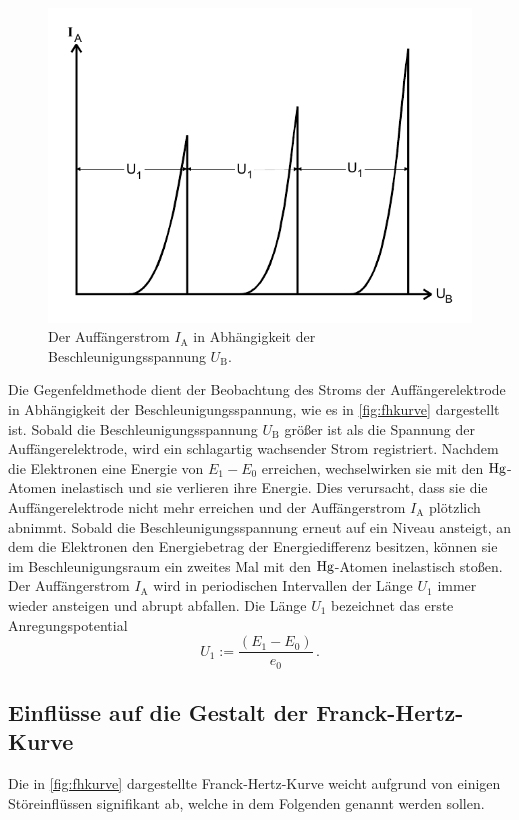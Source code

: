 \begin{figure}[H]
    \centering
    \includegraphics[width=0.6\linewidth]{pictures/frank-hertz-kurve.pdf}
    \caption{Der Auffängerstrom $I_\text{A}$ in Abhängigkeit der Beschleunigungsspannung $U_\text{B}$. \cite{v601}}
    \label{fig:fhkurve}
\end{figure}

Die Gegenfeldmethode dient der Beobachtung des Stroms der Auffängerelektrode in Abhängigkeit der Beschleunigungsspannung,
wie es in \autoref{fig:fhkurve} dargestellt ist.
Sobald die Beschleunigungsspannung $U_\text{B}$ größer ist als die Spannung der Auffängerelektrode, wird ein schlagartig wachsender Strom registriert.
Nachdem die Elektronen eine Energie von $E_1 - E_0$ erreichen, wechselwirken sie mit den $\ce{Hg}$-Atomen inelastisch und sie verlieren ihre Energie.
Dies verursacht, dass sie die Auffängerelektrode nicht mehr erreichen und der Auffängerstrom $I_\text{A}$ plötzlich abnimmt.
Sobald die Beschleunigungsspannung erneut auf ein Niveau ansteigt, an dem die Elektronen den Energiebetrag der Energiedifferenz besitzen,
können sie im Beschleunigungsraum ein zweites Mal mit den $\ce{Hg}$-Atomen inelastisch stoßen.
Der Auffängerstrom $I_\text{A}$ wird in periodischen Intervallen der Länge $U_1$ immer wieder ansteigen und abrupt abfallen. 
Die Länge $U_1$ bezeichnet das erste Anregungspotential
\begin{equation}\label{eq:u1}
    U_{1}:=\frac{\left(E_{1}-E_{0}\right)}{e_{0}} \, .
\end{equation}


\subsection{Einflüsse auf die Gestalt der Franck-Hertz-Kurve}

Die in \autoref{fig:fhkurve} dargestellte Franck-Hertz-Kurve weicht aufgrund von einigen Störeinflüssen signifikant ab, 
welche in dem Folgenden genannt werden sollen.


